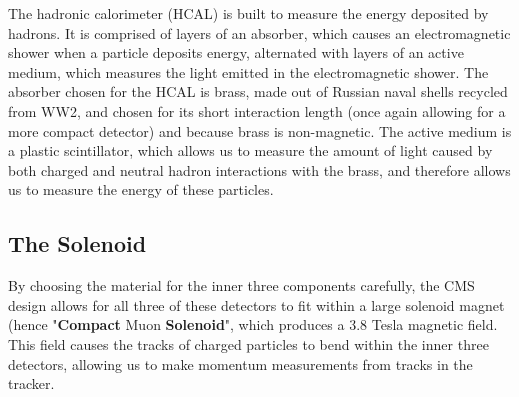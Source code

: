 The hadronic calorimeter (HCAL) is built to measure the energy deposited by hadrons. It is comprised of layers of an absorber, which causes an electromagnetic shower when a particle deposits energy, alternated with layers of an active medium, which measures the light emitted in the electromagnetic shower. The absorber chosen for the HCAL is brass, made out of Russian naval shells recycled from WW2, and chosen for its short interaction length (once again allowing for a more compact detector) and because brass is non-magnetic. The active medium is a plastic scintillator, which allows us to measure the amount of light caused by both charged and neutral hadron interactions with the brass, and therefore allows us to measure the energy of these particles. 


\vspace{5mm}
\subsection{The Solenoid}

By choosing the material for the inner three components carefully, the CMS design allows for all three of these detectors to fit within a large solenoid magnet (hence "\textbf{Compact} Muon \textbf{Solenoid}", which produces a 3.8 Tesla magnetic field. This field causes the tracks of charged particles to bend within the inner three detectors, allowing us to make momentum measurements from tracks in the tracker.
\vspace{5mm}

